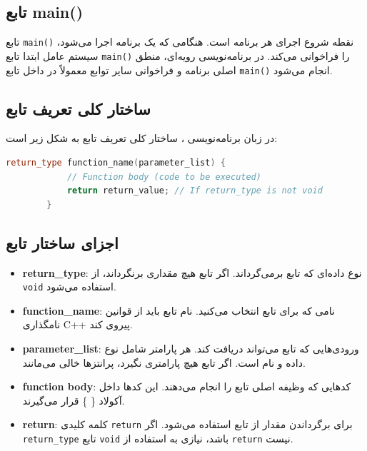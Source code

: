 \documentclass[12pt, a4paper]{report}
\begin{document}
\subsection{تابع main()}

تابع \texttt{main()} نقطه شروع اجرای هر برنامه  است. هنگامی که یک برنامه  اجرا می‌شود، سیستم عامل ابتدا تابع \texttt{main()} را فراخوانی می‌کند. در برنامه‌نویسی رویه‌ای، منطق اصلی برنامه و فراخوانی سایر توابع معمولاً در داخل تابع \texttt{main()} انجام می‌شود.

\subsection{ساختار کلی تعریف تابع}

در زبان برنامه‌نویسی ، ساختار کلی تعریف تابع به شکل زیر است:

\begin{LTR} %
	\begin{lstlisting}[language=C++, breaklines=true]
		return_type function_name(parameter_list) {
			// Function body (code to be executed)
			return return_value; // If return_type is not void
		}
	\end{lstlisting}
\end{LTR}

\subsection{اجزای ساختار تابع}

\begin{itemize}
	\item \textbf{return\_type}: نوع داده‌ای که تابع برمی‌گرداند. اگر تابع هیچ مقداری برنگرداند، از \texttt{void} استفاده می‌شود.
	\item \textbf{function\_name}: نامی که برای تابع انتخاب می‌کنید. نام تابع باید از قوانین نامگذاری C++ پیروی کند.
	\item \textbf{parameter\_list}: ورودی‌هایی که تابع می‌تواند دریافت کند. هر پارامتر شامل نوع داده و نام است. اگر تابع هیچ پارامتری نگیرد، پرانتزها خالی می‌مانند.
	\item \textbf{function body}: کدهایی که وظیفه اصلی تابع را انجام می‌دهند. این کدها داخل آکولاد \{ \} قرار می‌گیرند.
	\item \textbf{return}: کلمه کلیدی \texttt{return} برای برگرداندن مقدار از تابع استفاده می‌شود. اگر \texttt{return\_type} تابع \texttt{void} باشد، نیازی به استفاده از \texttt{return} نیست.
\end{itemize}
\end{document}
